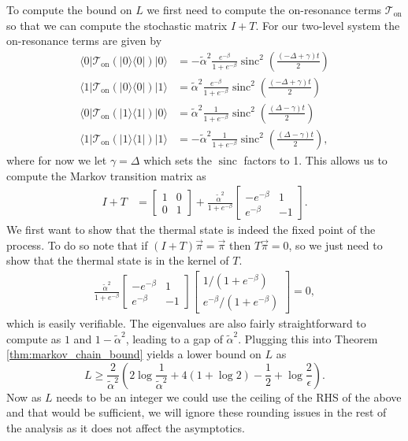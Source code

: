 \documentclass{article}
\newcommand{\on}{\text{on}}
\newcommand{\ket}[1]{|#1\rangle}
\newcommand{\bra}[1]{\langle #1|}
\newcommand{\ketbra}[2]{| #1\rangle\! \langle #2|}
\DeclareMathOperator{\sinc}{sinc}
\begin{document}
To compute the bound on $L$ we first need to compute the on-resonance terms $\mathcal{T}_{\on}$ so that we can compute the stochastic matrix $I + T$. For our two-level system the on-resonance terms are given by
\begin{align}
    \bra{0} \mathcal{T}_{\on}(\ketbra{0}{0}) \ket{0} &= - \widetilde{\alpha}^2 \frac{e^{-\beta}}{1 + e^{-\beta}} \sinc^2 \left( \frac{(-\Delta + \gamma)t}{2}\right) \\
    \bra{1} \mathcal{T}_{\on}(\ketbra{0}{0}) \ket{1} &=  \widetilde{\alpha}^2 \frac{e^{-\beta}}{1 + e^{-\beta}} \sinc^2 \left( \frac{(-\Delta + \gamma)t}{2}\right) \\
    \bra{0} \mathcal{T}_{\on}(\ketbra{1}{1}) \ket{0} &=  \widetilde{\alpha}^2 \frac{1}{1 + e^{-\beta}} \sinc^2 \left( \frac{(\Delta - \gamma)t}{2}\right)\\
    \bra{1} \mathcal{T}_{\on}(\ketbra{1}{1}) \ket{1} &= - \widetilde{\alpha}^2 \frac{1}{1 + e^{-\beta}} \sinc^2 \left( \frac{(\Delta - \gamma)t}{2}\right),
\end{align}
where for now we let $\gamma = \Delta$ which sets the $\sinc$ factors to 1. This allows us to compute the Markov transition matrix as
\begin{align}
    I + T &= \begin{bmatrix} 1 & 0 \\ 0 & 1 \end{bmatrix} + \frac{\widetilde{\alpha}^2}{1 + e^{-\beta}} \begin{bmatrix} -e^{-\beta} & 1 \\ e^{-\beta} & - 1 \end{bmatrix}.
\end{align}
We first want to show that the thermal state is indeed the fixed point of the process. To do so note that if $(I + T) \vec{\pi} = \vec{\pi}$ then $T \vec{\pi} = 0$, so we just need to show that the thermal state is in the kernel of $T$. 
\begin{align}
\frac{\widetilde{\alpha}^2}{1 + e^{-\beta}} \begin{bmatrix} -e^{-\beta} & 1 \\ e^{-\beta} & - 1 \end{bmatrix} \begin{bmatrix}
    1/(1 + e^{-\beta}) \\ e^{-\beta} / (1 + e^{-\beta}) 
\end{bmatrix} = 0,
\end{align}
which is easily verifiable. The eigenvalues are also fairly straightforward to compute as $1$ and $1 - \widetilde{\alpha}^2$, leading to a gap of $\widetilde{\alpha}^2$. Plugging this into Theorem \ref{thm:markov_chain_bound} yields a lower bound on $L$ as 
\begin{equation}
    L \ge \frac{2}{\widetilde{\alpha}^2} \left( 2 \log \frac{1}{\widetilde{\alpha}^2} + 4( 1 + \log 2) - \frac{1}{2} + \log \frac{2}{\epsilon} \right).
\end{equation}
Now as $L$ needs to be an integer we could use the ceiling of the RHS of the above and that would be sufficient, we will ignore these rounding issues in the rest of the analysis as it does not affect the asymptotics. 
\end{document}

